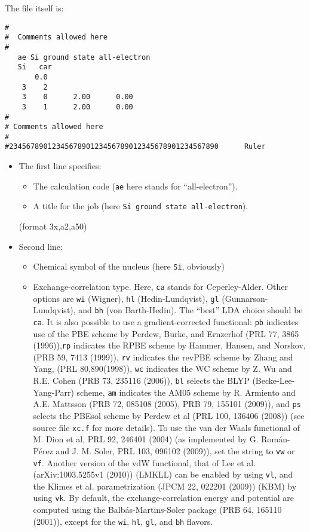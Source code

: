 \documentclass[11pt]{article}
\begin{document}
The file itself is:
\begin{verbatim}
#
#  Comments allowed here
#
   ae Si ground state all-electron
   Si   car  
       0.0
    3    2
    3    0      2.00      0.00
    3    1      2.00      0.00
#
# Comments allowed here
#
#2345678901234567890123456789012345678901234567890      Ruler
\end{verbatim}

\begin{itemize}
\item The first line specifies:
	\begin{itemize}
	\item The calculation code ({\tt ae} here stands for ``all-electron'').
	\item A title for the job (here {\tt Si ground state all-electron}).
	\end{itemize} 
	(format 3x,a2,a50)

\item Second line:
	\begin{itemize}

	\item Chemical symbol of the nucleus (here {\tt Si}, obviously)
	\item Exchange-correlation type. Here, {\tt ca} stands for
          Ceperley-Alder. Other options are {\tt wi}
          (Wigner), {\tt hl} (Hedin-Lundqvist), {\tt gl}
          (Gunnarson-Lundqvist), and {\tt bh} (von Barth-Hedin). The
          ``best'' LDA choice should be {\tt ca}.  It is also possible
          to use a gradient-corrected functional: {\tt pb} indicates use
          of the PBE scheme by Perdew, Burke, and Ernzerhof (PRL 77,
          3865 (1996)),{\tt rp} indicates the RPBE
          scheme by Hammer, Hansen, and Norskov, (PRB 59, 7413 (1999)),
          {\tt rv} indicates the revPBE
          scheme by Zhang and Yang, (PRL 80,890(1998)), 
          {\tt wc} indicates the WC
          scheme by Z. Wu and R.E. Cohen (PRB 73, 235116 (2006)),
          {\tt bl} selects the BLYP (Becke-Lee-Yang-Parr) scheme,
          {\tt am} indicates the AM05 scheme by R. Armiento and A.E. Mattsson 
          (PRB 72, 085108 (2005), PRB 79, 155101 (2009)),
          and {\tt ps} selects the PBEsol scheme by Perdew et al (PRL 100, 136406 (2008))
          (see source file {\tt xc.f} for more details).
          To use the van der Waals functional of M. Dion et al, PRL 92, 246401
          (2004) (as implemented by G. Rom\'an-P\'erez and J. M. Soler,
          PRL 103, 096102 (2009)), set the string to {\tt vw} or {\tt
            vf}.
          Another version of the vdW functional, that of Lee et
          al. (arXiv:1003.5255v1 (2010)) (LMKLL) can be enabled by using
          {\tt vl},
          and the Klimes et al. parametrization (JPCM 22, 022201
          (2009)) (KBM)
          by using {\tt vk}.
	  By default, the exchange-correlation energy and potential
	  are computed using the Balb\'as-Martins-Soler package 
	  (PRB 64, 165110 (2001)), except for
	  the {\tt wi}, {\tt hl}, {\tt gl}, and {\tt bh} flavors. 
   

\end{itemize}
\end{itemize}
\end{document}

